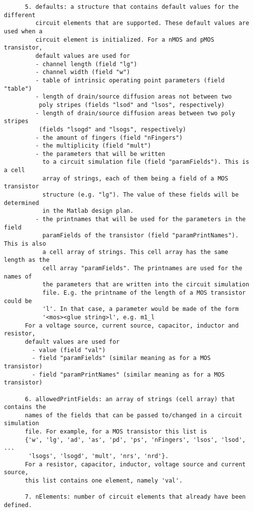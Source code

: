 \begin{verbatim}
      5. defaults: a structure that contains default values for the different
         circuit elements that are supported. These default values are used when a
         circuit element is initialized. For a nMOS and pMOS transistor,
         default values are used for 
         - channel length (field "lg")
         - channel width (field "w")
         - table of intrinsic operating point parameters (field "table")
         - length of drain/source diffusion areas not between two
          poly stripes (fields "lsod" and "lsos", respectively)
         - length of drain/source diffusion areas between two poly stripes
          (fields "lsogd" and "lsogs", respectively)
         - the amount of fingers (field "nFingers")
         - the multiplicity (field "mult")
         - the parameters that will be written
           to a circuit simulation file (field "paramFields"). This is a cell
           array of strings, each of them being a field of a MOS transistor
           structure (e.g. "lg"). The value of these fields will be determined
           in the Matlab design plan.
         - the printnames that will be used for the parameters in the field
           paramFields of the transistor (field "paramPrintNames"). This is also
           a cell array of strings. This cell array has the same length as the
           cell array "paramFields". The printnames are used for the names of
           the parameters that are written into the circuit simulation
           file. E.g. the printname of the length of a MOS transistor could be
           'l'. In that case, a parameter would be made of the form
           '<mos><glue string>l', e.g. m1_l
      For a voltage source, current source, capacitor, inductor and resistor, 
      default values are used for 
        - value (field "val")
        - field "paramFields" (similar meaning as for a MOS transistor)
        - field "paramPrintNames" (similar meaning as for a MOS transistor)
 
      6. allowedPrintFields: an array of strings (cell array) that contains the
      names of the fields that can be passed to/changed in a circuit simulation
      file. For example, for a MOS transistor this list is
      {'w', 'lg', 'ad', 'as', 'pd', 'ps', 'nFingers', 'lsos', 'lsod', ...
       'lsogs', 'lsogd', 'mult', 'nrs', 'nrd'}.
      For a resistor, capacitor, inductor, voltage source and current source,
      this list contains one element, namely 'val'.
 
      7. nElements: number of circuit elements that already have been defined.
 

\end{verbatim}
